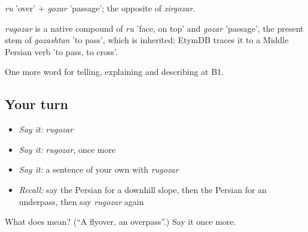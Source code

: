 \emph{ru} 'over' + \emph{gozar} 'passage'; the opposite of \emph{zirgozar}.

\begin{cousinweb}
\emph{rugozar} is a native compound of \emph{ru} 'face, on top' and \emph{gozar} 'passage', the present stem of \emph{gozashtan} 'to pass', which is inherited: EtymDB traces it to a Middle Persian verb 'to pass, to cross'.
\end{cousinweb}

\begin{grammarlens}[title={What you've built}]
One more word for telling, explaining and describing at B1.
\end{grammarlens}

\subsection*{Your turn}
\begin{itemize}
\raggedright
  \item \emph{Say it:} \emph{rugozar}
  \item \emph{Say it:} \emph{rugozar}, once more
  \item \emph{Say it:} a sentence of your own with \emph{rugozar}
  \item \emph{Recall:} say the Persian for a downhill slope, then the Persian for an underpass, then say \emph{rugozar} again
\end{itemize}

\begin{tcolorbox}[breakable,colback=teal!4,colframe=teal!35!black,title={Before you move on}]
What does  mean? (\textquotedblleft{}A flyover, an overpass\textquotedblright{}.) Say it once more.
\end{tcolorbox}

